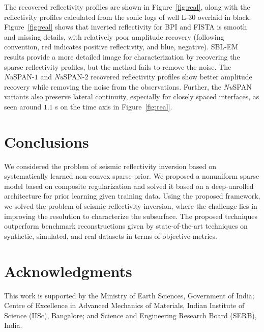 \documentclass[journal]{IEEEtran}
\newcommand{\rgbsymbol}{\texttt{[image: figures/rgb.png]}}
\begin{document}
The recovered reflectivity profiles are shown in Figure~\ref{fig:real}, along with the reflectivity profiles calculated from the sonic logs of well L-$30$ overlaid in black. Figure~\ref{fig:real} shows that inverted reflectivity for BPI and FISTA is smooth and missing details, with relatively poor amplitude recovery (following convention, red indicates positive reflectivity, and blue, negative). SBL-EM results provide a more detailed image for characterization by recovering the sparse reflectivity profiles, but the method fails to remove the noise. The {\it Nu}SPAN-$1$ and {\it Nu}SPAN-$2$ recovered reflectivity profiles show better amplitude recovery while removing the noise from the observations. Further, the {\it Nu}SPAN variants also preserve lateral continuity, especially for closely spaced interfaces, as seen around $1.1$ s on the time axis in Figure~\ref{fig:real}.

\begin{figure*}[!ht]
    \centering
    \caption{\protect\rgbsymbol~(a) Observed seismic data, and (b)-(f) predicted reflectivity profiles for the inset marked in (a) for Xline $1155$ of the Penobscot $3$-D survey \cite{penobscot3d}. The overlaid waveforms in black show the recorded (a) well seismic and (b)-(f) reflectivity profiles, respectively, at well L-30 \cite{bianco2014geophysical}. {\it Nu}SPAN-$1$ and {\it Nu}SPAN-$2$ show superior amplitude recovery while also removing noise from the observations.} 
    \label{fig:real}
\end{figure*}

\section{Conclusions}\label{sec:conclusions}
We considered the problem of seismic reflectivity inversion based on systematically learned non-convex sparse-prior. We proposed a nonuniform sparse model based on composite regularization and solved it based on a deep-unrolled architecture for prior learning given training data. Using the proposed framework, we solved the problem of seismic reflectivity inversion, where the challenge lies in improving the resolution to characterize the subsurface. The proposed techniques outperform benchmark reconstructions given by state-of-the-art techniques on synthetic, simulated, and real datasets in terms of objective metrics.

\section*{Acknowledgments}
This work is supported by the Ministry of Earth Sciences, Government of India; Centre of Excellence in Advanced Mechanics of Materials, Indian Institute of Science (IISc), Bangalore; and Science and Engineering Research Board (SERB), India. 
\end{document}
